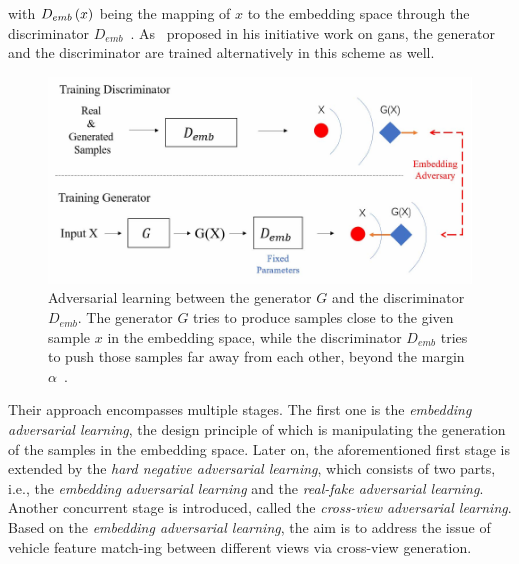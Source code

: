\noindent with ${D_{emb}} \left( x \right)$ being the mapping of $x$ to the embedding space through the discriminator $D_{emb}$~\cite{Lou2019}. As~\cite{Goodfellow2014} proposed in his initiative work on \glspl{gan}, the generator and the discriminator are trained alternatively in this scheme as well.

\begin{figure}[t]
    \centerline{\includegraphics[width=0.8\linewidth]{figures/theoretical_foundations/ealn_discriminator_generator_scheme.pdf}}
    \caption[Embedding adversarial learning architecture]{Adversarial learning between the generator $G$ and the discriminator $D_{emb}$. The generator $G$ tries to produce samples close to the given sample $x$ in the embedding space, while the discriminator $D_{emb}$ tries to push those samples far away from each other, beyond the margin $\alpha$~\cite{Lou2019}.}
    \label{fig:EALNDiscriminatorGeneratorScheme}
\end{figure}

Their approach encompasses multiple stages. The first one is the \emph{embedding adversarial learning}, the design principle of which is manipulating the generation of the samples in the embedding space. Later on, the aforementioned first stage is extended by the \emph{hard negative adversarial learning}, which consists of two parts, i.e., the \emph{embedding adversarial learning} and the \emph{real-fake adversarial learning}. Another concurrent stage is introduced, called the \emph{cross-view adversarial learning}. Based on the \emph{embedding adversarial learning}, the aim is to address the issue of vehicle feature match-ing between different views via cross-view generation.
